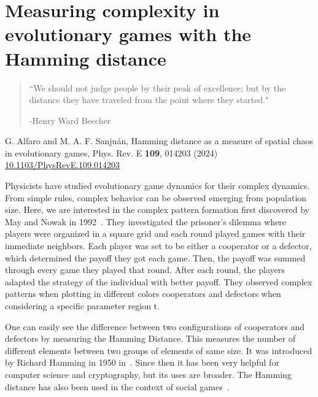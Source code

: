 \chapter{Measuring complexity in evolutionary games with the Hamming distance}
\label{chap:HammingGames}




\begin{quotation}

	\vspace{-3cm}
    \begin{flushright}
    \begin{minipage}[t][5cm][b]{0.5\textwidth}
    { ``We should not judge people by their peak of excellence; but by the distance they have traveled from the point where they started."}
    
    \bigskip
    
    -{\small  Henry Ward Beecher}
    \end{minipage}
    \end{flushright}
    
    \vspace{0.5cm}
\end{quotation}

\vspace{0.5cm}

G. Alfaro and M. A. F. Sanjuán,
Hamming distance as a measure of spatial chaos in evolutionary games,
Phys. Rev. E \textbf{109}, 014203 (2024)
\url{10.1103/PhysRevE.109.014203}


\vspace{1cm}

Physicists have studied evolutionary game dynamics for their complex dynamics. From simple rules, complex behavior can be observed emerging from population size. Here, we are interested in the complex pattern formation first discovered by May and Nowak in 1992~\cite{SpatialChaos}. They investigated the prisoner's dilemma where players were organized in a square grid and each round played games with their immediate neighbors. Each player was set to be either a cooperator or a defector, which determined the payoff they got each game. Then, the payoff was summed through every game they played that round. After each round, the players adapted the strategy of the individual with better payoff. They observed complex patterns when plotting in different colors cooperators and defectors when considering a specific parameter region t.

One can easily see the difference between two configurations of cooperators and defectors by measuring the Hamming Distance. This measures the number of different elements between two groups of elements of same size. It was introduced
by Richard Hamming in 1950 in~\cite{HammingOrigins}. Since then it has been very helpful for computer science and cryptography, but its uses are broader. The Hamming distance has also been used in the context of social games~\cite{HammingSocial1, HammingSocial2}.

